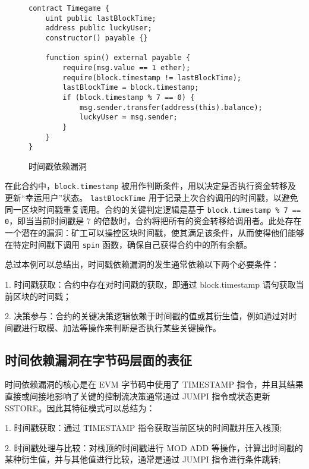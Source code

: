 \documentclass[print, master, vlined, timesmath]{DissertUESTC}
\begin{document}
\begin{figure}[H]
    \centering
    \begin{minipage}{0.9\textwidth}
    \begin{verbatim}
contract Timegame {
    uint public lastBlockTime;
    address public luckyUser;
    constructor() payable {}

    function spin() external payable {
        require(msg.value == 1 ether);
        require(block.timestamp != lastBlockTime);
        lastBlockTime = block.timestamp;
        if (block.timestamp % 7 == 0) {
            msg.sender.transfer(address(this).balance);
            luckyUser = msg.sender;
        }
    }
}
    \end{verbatim}
    \end{minipage}
    \caption{时间戳依赖漏洞}
    \label{fig:timestamp-dependency}
\end{figure}

在此合约中，\texttt{block.timestamp} 被用作判断条件，用以决定是否执行资金转移及更新“幸运用户”状态。 \texttt{lastBlockTime} 用于记录上次合约调用的时间戳，以避免同一区块时间戳重复调用。合约的关键判定逻辑是基于 \texttt{block.timestamp \% 7 == 0}，即当当前时间戳是 7 的倍数时，合约将把所有的资金转移给调用者。此处存在一个潜在的漏洞：矿工可以操控区块时间戳，使其满足该条件，从而使得他们能够在特定时间戳下调用 \texttt{spin} 函数，确保自己获得合约中的所有余额。

总过本例可以总结出，时间戳依赖漏洞的发生通常依赖以下两个必要条件：

1. 时间戳获取：合约中存在对时间戳的获取，即通过 block.timestamp 语句获取当前区块的时间戳；

2. 决策参与：合约的关键决策逻辑依赖于时间戳的值或其衍生值，例如通过对时间戳进行取模、加法等操作来判断是否执行某些关键操作。

\subsection{时间依赖漏洞在字节码层面的表征}


时间依赖漏洞的核心是在 EVM 字节码中使用了 TIMESTAMP 指令，并且其结果直接或间接地影响了关键的控制流决策通常通过 JUMPI 指令或状态更新 SSTORE。因此其特征模式可以总结为：

1. 时间戳获取：通过 TIMESTAMP 指令获取当前区块的时间戳并压入栈顶;

2. 时间戳处理与比较：对栈顶的时间戳进行 MOD ADD 等操作，计算出时间戳的某种衍生值，并与其他值进行比较，通常是通过 JUMPI 指令进行条件跳转;
\end{document}
